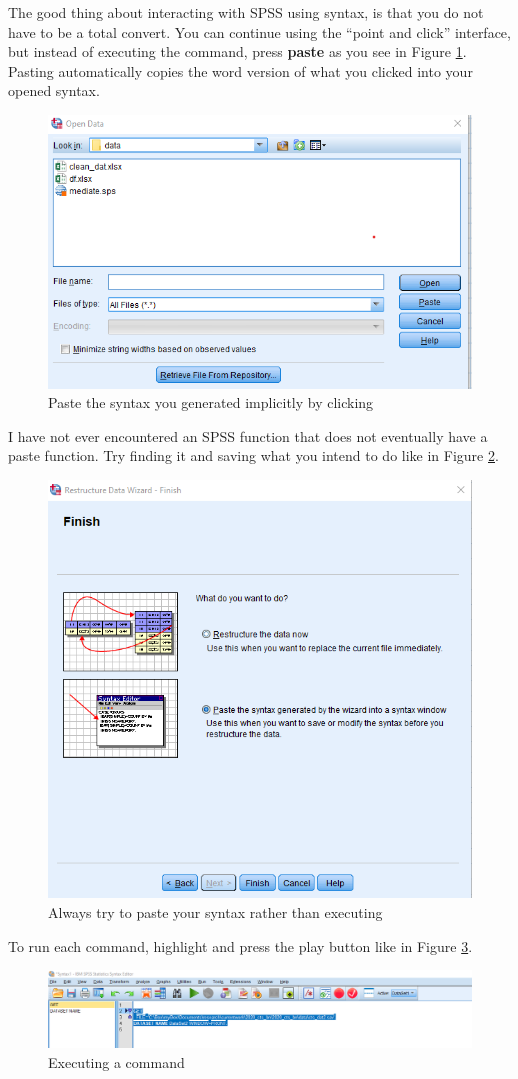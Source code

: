 \documentclass[
]{book}
\begin{document}
The good thing about interacting with SPSS using syntax, is that you do not have to be a total convert. You can continue using the ``point and click'' interface, but instead of executing the command, press \textbf{paste} as you see in Figure \ref{fig:paste-syntax}. Pasting automatically copies the word version of what you clicked into your opened syntax.

\begin{figure}
\includegraphics[width=0.6\linewidth]{images/paste_syntax} \caption{Paste the syntax you generated implicitly by clicking}\label{fig:paste-syntax}
\end{figure}

I have not ever encountered an SPSS function that does not eventually have a paste function. Try finding it and saving what you intend to do like in Figure \ref{fig:paste-syntax2}.

\begin{figure}
\includegraphics[width=0.5\linewidth]{images/paste_syntax2} \caption{Always try to paste your syntax rather than executing}\label{fig:paste-syntax2}
\end{figure}

To run each command, highlight and press the play button like in Figure \ref{fig:play}.

\begin{figure}
\includegraphics[width=0.8\linewidth]{images/run_syntax} \caption{Executing a command}\label{fig:play}
\end{figure}
\end{document}
